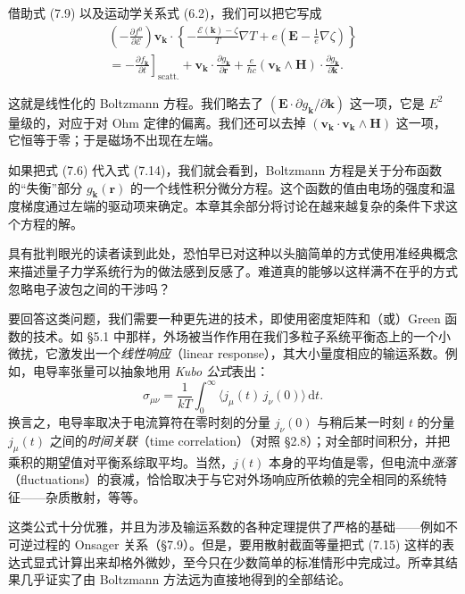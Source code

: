 借助式 (7.9) 以及运动学关系式 (6.2)，我们可以把它写成
\begin{align*}
\left(-\frac{\partial f^{0}}{\partial\mathcal{E}}\right)
\mathbf{v}_{\mathbf{k}}\cdot\left\{-\frac{\mathcal{E}(\mathbf{k})-\zeta}{T}\nabla T
+e\left(\mathbf{E}-\frac{1}{e}\nabla\zeta\right)\right\}\\
=-\left.\frac{\partial f_{\mathbf{k}}}{\partial t}\right]_{\text{scatt.}}
+\mathbf{v}_{\mathbf{k}}\cdot\frac{\partial g_{\mathbf{k}}}{\partial\mathbf{r}}
+\frac{e}{\hbar c}(\mathbf{v}_{\mathbf{k}}\wedge\mathbf{H})\cdot\frac{\partial g_{\mathbf{k}}}{\partial\mathbf{k}}.\tag{7.14}
\end{align*}

这就是线性化的 Boltzmann 方程。我们略去了 $(\mathbf{E}\cdot\partial g_{\mathbf{k}}/\partial\mathbf{k})$ 这一项，它是 $E^{2}$ 量级的，对应于对 Ohm 定律的偏离。我们还可以去掉 $(\mathbf{v}_{\mathbf{k}}\cdot\mathbf{v}_{\mathbf{k}}\wedge\mathbf{H})$ 这一项，它恒等于零；于是磁场不出现在左端。

如果把式 (7.6) 代入式 (7.14)，我们就会看到，Boltzmann 方程是关于分布函数的“失衡”部分 $g_{\mathbf{k}}(\mathbf{r})$ 的一个线性积分微分方程。这个函数的值由电场的强度和温度梯度通过左端的驱动项来确定。本章其余部分将讨论在越来越复杂的条件下求这个方程的解。

具有批判眼光的读者读到此处，恐怕早已对这种以头脑简单的方式使用准经典概念来描述量子力学系统行为的做法感到反感了。难道真的能够以这样满不在乎的方式忽略电子波包之间的干涉吗？

要回答这类问题，我们需要一种更先进的技术，即使用密度矩阵和（或）Green 函数的技术。如 §5.1 中那样，外场被当作作用在我们多粒子系统平衡态上的一个小微扰，它激发出一个\emph{线性响应}（linear response），其大小量度相应的输运系数。例如，电导率张量可以抽象地用 \emph{Kubo 公式}表出：
\begin{equation*}
\sigma_{\mu\nu}=\frac{1}{kT}\int_{0}^{\infty}\langle j_{\mu}(t)\,j_{\nu}(0)\rangle\,\mathrm{d}t.\tag{7.15}
\end{equation*}
换言之，电导率取决于电流算符在零时刻的分量 $j_{\nu}(0)$ 与稍后某一时刻 $t$ 的分量 $j_{\mu}(t)$ 之间的\emph{时间关联}（time correlation）（对照 §2.8）；对全部时间积分，并把乘积的期望值对平衡系综取平均。当然，$j(t)$ 本身的平均值是零，但电流中\emph{涨落}（fluctuations）的衰减，恰恰取决于与它对外场响应所依赖的完全相同的系统特征——杂质散射，等等。

这类公式十分优雅，并且为涉及输运系数的各种定理提供了严格的基础——例如不可逆过程的 Onsager 关系（§7.9）。但是，要用散射截面等量把式 (7.15) 这样的表达式显式计算出来却格外微妙，至今只在少数简单的标准情形中完成过。所幸其结果几乎证实了由 Boltzmann 方法远为直接地得到的全部结论。

